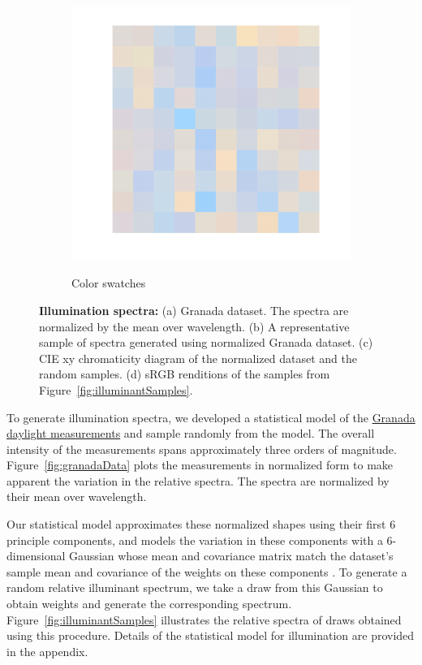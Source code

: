 \documentclass{jov}
\begin{document}
\begin{figure}
\begin{subfigure}[b]{0.24 \textwidth}
        \label{fig:xyDiagram}
        \end{subfigure}
      	\begin{subfigure}[b]{0.24 \textwidth}
    \centering
        \caption{Color swatches}
        \includegraphics[width=\textwidth]{../FiguresDraft4/Figure6/Figure6_d.pdf}
        \label{fig:sRGBIlluminant}
    \end{subfigure}
    \caption{{\bf Illumination spectra:} (a) Granada dataset. The spectra are normalized by the mean over wavelength. (b) A representative sample of spectra generated using normalized Granada dataset. (c) CIE xy chromaticity diagram of the normalized dataset and the random samples. (d) sRGB renditions of the samples from Figure~\ref{fig:illuminantSamples}.}
\label{fig:illuminant}
\end{figure}

To generate illumination spectra, we developed a statistical model of the \href{http://colorimaginglab.ugr.es/pages/Data}{Granada daylight measurements} \cite{hernandez2001color} and sample randomly from the model.
The overall intensity of the measurements spans approximately three orders of magnitude.
Figure~\ref{fig:granadaData} plots the measurements in normalized form to make apparent the variation in the relative spectra. The spectra are normalized by their mean over wavelength.

Our statistical model approximates these normalized shapes using their first 6 principle components, and models the variation in these components with
a 6-dimensional Gaussian whose mean and covariance matrix match the dataset's sample mean and covariance of the weights on these components \cite{BrainardFreeman}.
To generate a random relative illuminant spectrum, we take a draw from this Gaussian to obtain weights and generate the corresponding spectrum.
Figure~\ref{fig:illuminantSamples} illustrates the relative spectra of draws obtained using this procedure.
Details of the statistical model for illumination are provided in the appendix.
\end{document}
